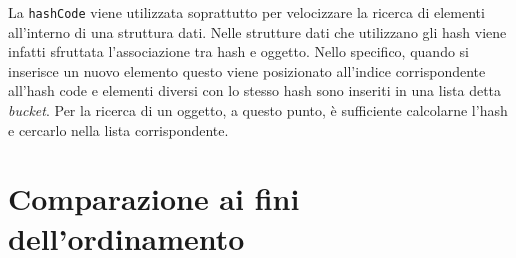 \documentclass[12pt, a4paper]{article}
\begin{document}
\begin{itemize}
    La \texttt{hashCode} viene utilizzata soprattutto per velocizzare la ricerca di
    elementi all'interno di una struttura dati. Nelle strutture dati che utilizzano
    gli hash viene infatti sfruttata l'associazione tra hash e oggetto. Nello specifico,
    quando si inserisce un nuovo elemento questo viene posizionato all'indice
    corrispondente all'hash code e elementi diversi con lo stesso hash sono inseriti
    in una lista detta \emph{bucket}. Per la ricerca di un oggetto, a questo punto, è
    sufficiente calcolarne l'hash e cercarlo nella lista corrispondente.
\end{itemize}

\section{Comparazione ai fini dell'ordinamento}
\end{document}
